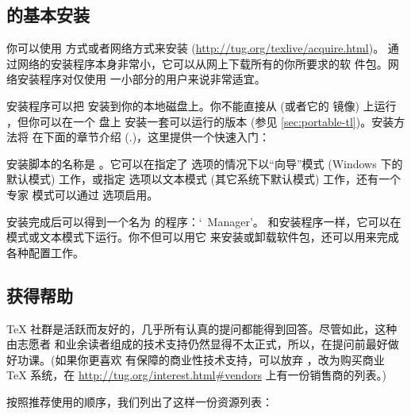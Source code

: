 \documentclass{article}
\begin{document}
\subsection{\protect\TL{} 的基本安装}
\label{sec:basic}

你可以使用 \DVD{} 方式或者网络方式来安装 \TL{}
(\url{http://tug.org/texlive/acquire.html})。
通过网络的安装程序本身非常小，它可以从网上下载所有的你所要求的软
件包。网络安装程序对仅使用 \TL{} 一小部分的用户来说非常适宜。

\DVD{} 安装程序可以把 \TL{} 安装到你的本地磁盘上。你不能直接从 \TK{}
\DVD{} (或者它的  镜像) 上运行 \TL{}，但你可以在一个 \USB{} 盘上
安装一套可以运行的版本 (参见 \ref{sec:portable-tl})。安装方法将
在下面的章节介绍 (\p.\pageref{sec:install})，这里提供一个快速入门：

\begin{itemize*}

\item 安装脚本的名称是 。它可以在指定了
 选项的情况下以“向导”模式 (Windows 下的默认模式)
工作，或指定  选项以文本模式 (其它系统下默认模式)
工作，还有一个专家 \GUI{} 模式可以通过  选项启用。

\item 安装完成后可以得到一个名为  的程序：`\TL\ Manager'。
和安装程序一样，它可以在 \GUI{} 模式或文本模式下运行。你不但可以用它
来安装或卸载软件包，还可以用来完成各种配置工作。

\end{itemize*}


\subsection{获得帮助}
\label{sec:help}

\TeX{} 社群是活跃而友好的，几乎所有认真的提问都能得到回答。尽管如此，这种由志愿者
和业余读者组成的技术支持仍然显得不太正式，所以，在提问前最好做好功课。(如果你更喜欢
有保障的商业性技术支持，可以放弃 \TL{}，改为购买商业 \TeX{} 系统，在
\url{http://tug.org/interest.html#vendors} 上有一份销售商的列表。)

按照推荐使用的顺序，我们列出了这样一份资源列表：
\end{document}
